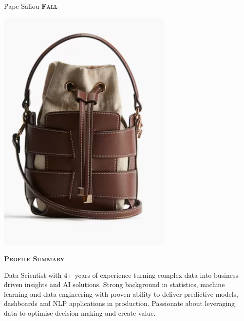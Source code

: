 \documentclass[11pt,a4paper]{article}
\newcommand{\headleft}[1]{\vspace*{3ex}\textsc{\textbf{#1}}\par%
    \vspace*{-1.5ex}\hrulefill\par\vspace*{0.7ex}}
\begin{document}
\setlength{\topskip}{0pt}\setlength{\parindent}{0pt}\setlength{\parskip}{0pt}
\setlength{\fboxsep}{0pt}\pagestyle{empty}\raggedbottom

\begin{minipage}[t]{0.33\textwidth}
\colorbox{cvblue}{\begin{minipage}[t][5mm][t]{\textwidth}\null\hfill\null\end{minipage}}
\vspace{-.2ex}
\colorbox{cvblue!90}{\color{white}
\textwidth
\begin{minipage}[t][293mm][t]{0.82\textwidth}\raggedright
\vspace*{2.5ex}

\Large Pape Saliou \textbf{\textsc{Fall}} \normalsize

\null\hfill\includegraphics[width=0.65\textwidth]{ f95ece428f1f455cbac29e0cd7748163.png }\hfill\null

\vspace*{0.5ex}

\headleft{Profile Summary}
Data Scientist with 4+ years of experience turning complex data into business-driven insights and AI solutions. Strong background in statistics, machine learning and data engineering with proven ability to deliver predictive models, dashboards and NLP applications in production. Passionate about leveraging data to optimise decision-making and create value.


\end{minipage}}
\end{minipage}
\end{document}
